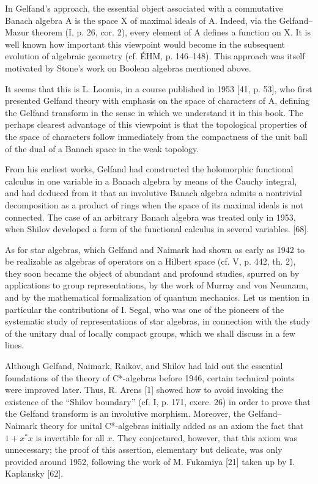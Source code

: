 In Gelfand's approach, the essential object associated with a commutative Banach algebra A is the space X of maximal ideals of A. Indeed, via the Gelfand--Mazur theorem (I, p. 26, cor. 2), every element of A defines a function on X. It is well known how important this viewpoint would become in the subsequent evolution of algebraic geometry (cf. ÉHM, p. 146--148). This approach was itself motivated by Stone's work on Boolean algebras mentioned above.

It seems that this is L. Loomis, in a course published in 1953 {[}41, p. 53{]}, who first presented Gelfand theory with emphasis on the space of characters of A, defining the Gelfand transform in the sense in which we understand it in this book. The perhaps clearest advantage of this viewpoint is that the topological properties of the space of characters follow immediately from the compactness of the unit ball of the dual of a Banach space in the weak topology.

From his earliest works, Gelfand had constructed the holomorphic functional calculus in one variable in a Banach algebra by means of the Cauchy integral, and had deduced from it that an involutive Banach algebra admits a nontrivial decomposition as a product of rings when the space of its maximal ideals is not connected. The case of an arbitrary Banach algebra was treated only in 1953, when Shilov developed a form of the functional calculus in several variables. {[}68{]}.

As for star algebras, which Gelfand and Naimark had shown as early as 1942 to be realizable as algebras of operators on a Hilbert space (cf. V, p. 442, th. 2), they soon became the object of abundant and profound studies, spurred on by applications to group representations, by the work of Murray and von Neumann, and by the mathematical formalization of quantum mechanics. Let us mention in particular the contributions of I. Segal, who was one of the pioneers of the systematic study of representations of star algebras, in connection with the study of the unitary dual of locally compact groups, which we shall discuss in a few lines.

Although Gelfand, Naimark, Raikov, and Shilov had laid out the essential foundations of the theory of C*-algebras before 1946, certain technical points were improved later. Thus, R. Arens {[}1{]} showed how to avoid invoking the existence of the “Shilov boundary” (cf. I, p. 171, exerc. 26) in order to prove that the Gelfand transform is an involutive morphism. Moreover, the Gelfand–Naimark theory for unital C*-algebras initially added as an axiom the fact that \(1 + x^{*}x\) is invertible for all \(x\). They conjectured, however, that this axiom was unnecessary; the proof of this assertion, elementary but delicate, was only provided around 1952, following the work of M. Fukamiya {[}21{]} taken up by I. Kaplansky {[}62{]}.

